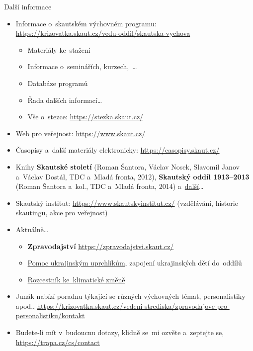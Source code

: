 \documentclass[compress, xelatex, 11pt, xcolor=dvipsnames, print, aspectratio=169,
	hyperref={
		bookmarks=true,
		unicode=true,
		colorlinks=true,
		pdftitle={Skautska vychovna metoda},
		plainpages=false,
		pdfauthor={Vojtech Zeisek},
		pdfsubject={Skautska vychovna metoda a jeji vyvoj za posledni stoleti a desetileti},
		pdfcreator={XeLaTeX},
		pdfkeywords={Junak, Pedagogika, Skaut, Skauting, Vychovna metoda},
		linkcolor=Red, %
		anchorcolor=ForestGreen, %
		citecolor=ForestGreen, %
		filecolor=ForestGreen, %
		menucolor=ForestGreen, %
		urlcolor=Sepia, %
		pdftex},
	url={hyphens, lowtilde} %
	]{beamer}
\begin{document}
\begin{frame}[allowframebreaks]{Další informace}
	\begin{itemize}
		\item Informace o~skautském výchovném programu: \url{https://krizovatka.skaut.cz/vedu-oddil/skautska-vychova}
		\begin{itemize}
			\item Materiály ke~stažení
			\item Informace o~seminářích, kurzech,~\ldots
			\item Databáze programů
			\item Řada dalších informací\ldots
			\item Vše o~stezce: \url{https://stezka.skaut.cz/}
		\end{itemize}
		\item Web pro veřejnost: \url{https://www.skaut.cz/}
		\item Časopisy a~další materiály elektronicky: \url{https://casopisy.skaut.cz/}
		\item Knihy \textbf{Skautské století} (Roman Šantora, Václav Nosek, Slavomil Janov a~Václav Dostál, TDC a~Mladá fronta, 2012), \textbf{Skautský oddíl 1913--2013} (Roman Šantora a~kol., TDC a~Mladá fronta, 2014) a~\href{https://www.junshop.cz/knihy}{další}\ldots
		\item Skautský institut: \url{https://www.skautskyinstitut.cz/} (vzdělávání, historie skautingu, akce pro veřejnost)
		\item Aktuálně\ldots
		\begin{itemize}
			\item \textbf{Zpravodajství} \url{https://zpravodajstvi.skaut.cz/}
			\item \href{https://krizovatka.skaut.cz/ukrajina}{Pomoc ukrajinským uprchlíkům}, zapojení ukrajinských dětí do~oddílů
			\item \href{https://krizovatka.skaut.cz/klimaticka-zmena/rozcestnik-ke-klimaticke-zmene}{Rozcestník ke~klimatické změně}
		\end{itemize}
		\item Junák nabízí poradnu týkající se různých výchovných témat, personalistiky apod., \url{https://krizovatka.skaut.cz/vedeni-strediska/zpravodajove-pro-personalistiku/kontakt}
		\item Budete-li mít v~budoucnu dotazy, klidně se~mi ozvěte a~zeptejte se, \url{https://trapa.cz/cs/contact}
	\end{itemize}
\end{frame}
\end{document}
